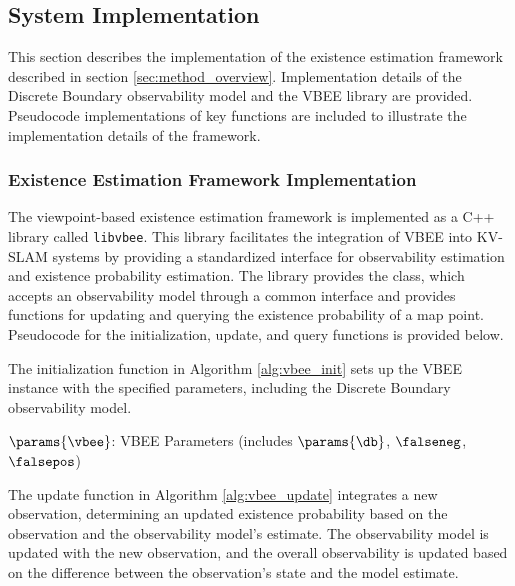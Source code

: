 \subsection{System Implementation}

This section describes the implementation of the existence estimation framework described in section \ref{sec:method_overview}. Implementation details of the Discrete Boundary observability model and the VBEE library are provided. Pseudocode implementations of key functions are included to illustrate the implementation details of the framework.

\subsubsection{Existence Estimation Framework Implementation}

The viewpoint-based existence estimation framework is implemented as a C++ library called \texttt{libvbee}. This library facilitates the integration of VBEE into KV-SLAM systems by providing a standardized interface for observability estimation and existence probability estimation. The library provides the \vbee{} class, which accepts an observability model through a common interface and provides functions for updating and querying the existence probability of a map point. Pseudocode for the initialization, update, and query functions is provided below.

The initialization function in Algorithm \ref{alg:vbee_init} sets up the VBEE instance with the specified parameters, including the Discrete Boundary observability model.

\begin{singlespace}
    \begin{algorithm}[H]
        \caption[VBEE Initialization]{VBEE Initialization: $\vbee.\initialize{\params{\vbee}}$}
        \label{alg:vbee_init}
        \begin{algorithmic}
            \Require $\params{\vbee}$: VBEE Parameters (includes $\params{\db}$, $\falseneg$, $\falsepos$)
        \end{algorithmic}
    \end{algorithm}
\end{singlespace}

The update function in Algorithm \ref{alg:vbee_update} integrates a new observation, determining an updated existence probability based on the observation and the observability model's estimate. The observability model is updated with the new observation, and the overall observability is updated based on the difference between the observation's state and the model estimate.

